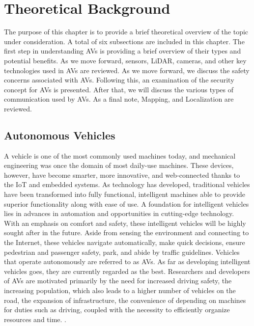 \documentclass[a4paper,12pt]{article}
\begin{document}
\newpage

\section{Theoretical Background}
\label{background}
\hspace{5mm} The purpose of this chapter is to provide a brief theoretical overview of the topic under consideration. A total of six subsections are included in this chapter. The first step in understanding AVs is providing a brief overview of their types and potential benefits. As we move forward, sensors, LiDAR, cameras, and other key technologies used in AVs are reviewed. As we move forward, we discuss the safety concerns associated with AVs. Following this, an examination of the security concept for AVs is presented. After that, we will discuss the various types of communication used by AVs. As a final note, Mapping, and Localization are reviewed.


\subsection{Autonomous Vehicles}

\hspace{5mm} A vehicle is one of the most commonly used machines today, and mechanical engineering was once the domain of most daily-use machines. These devices, however, have become smarter, more innovative, and web-connected thanks to the IoT and embedded systems. As technology has developed, traditional vehicles have been transformed into fully functional, intelligent machines able to provide superior functionality along with ease of use. A foundation for intelligent vehicles lies in advances in automation and opportunities in cutting-edge technology. With an emphasis on comfort and safety, these intelligent vehicles will be highly sought after in the future. Aside from sensing the environment and connecting to the Internet, these vehicles navigate automatically, make quick decisions, ensure pedestrian and passenger safety, park, and abide by traffic guidelines. Vehicles that operate autonomously are referred to as AVs. As far as developing intelligent vehicles goes, they are currently regarded as the best. Researchers and developers of AVs are motivated primarily by the need for increased driving safety, the increasing population, which also leads to a higher number of vehicles on the road, the expansion of infrastructure, the convenience of depending on machines for duties such as driving, coupled with the necessity to efficiently organize resources and time. \cite{article15}. \par
\end{document}
